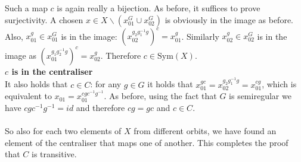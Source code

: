 \documentclass{article}
\begin{document}
\noindent
Such a map $c$ is again really a bijection. As before, it suffices to prove surjectivity. A chosen $x \in X \backslash \left(x_{01}^G \cup x_{02}^G\right)$ is obviously in the image as before. Also, $x_{01}^g \in x_{01}^G$ is in the image: $\left(x_{02}^{g_2 g_1^{-1} g}\right)^c = x_{01}^g$. Similarly $x_{02}^g \in x_{02}^G$ is in the image as $\left(x_{01}^{g_1 g_2^{-1} g}\right)^c = x_{02}^g$. Therefore $c \in \mathrm{Sym}(X)$.
\\
\noindent\textbf{$c$ is in the centraliser}
\\
\noindent It also holds that $c \in C$: for any $g \in G$ it holds that $x_{01}^{gc} = x_{02}^{g_2 g_1^{-1} g} = x_{01}^{cg}$, which is equivalent to $x_{01} = x_{01}^{cg c^{-1} g^{-1}}$. As before, using the fact that $G$ is semiregular we have $c g c^{-1} g^{-1} = id$ and  therefore $cg = gc$ and $c \in C$.
\\
\\
\noindent So also for each two elements of $X$ from different orbits, we have found an element of the centraliser that maps one of another. This completes the proof that $C$ is transitive.
\end{document}
